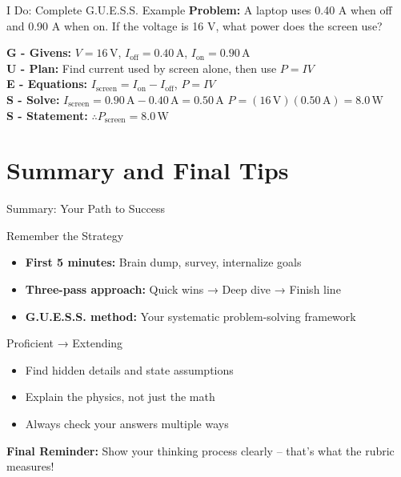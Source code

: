 \documentclass{beamer}
\begin{document}
\begin{frame}{I Do: Complete G.U.E.S.S. Example}
\textbf{Problem:} A laptop uses 0.40 A when off and 0.90 A when on. If the voltage is 16 V, what power does the screen use?
\pause
\vspace{0.5cm}

\textbf{G - Givens:} $V = 16\,\text{V}$, $I_{\text{off}} = 0.40\,\text{A}$, $I_{\text{on}} = 0.90\,\text{A}$ \\
\pause
\textbf{U - Plan:} Find current used by screen alone, then use $P = IV$ \\
\pause
\textbf{E - Equations:} $I_{\text{screen}} = I_{\text{on}} - I_{\text{off}}$, $P = IV$ \\
\pause
\textbf{S - Solve:} 
$I_{\text{screen}} = 0.90\,\text{A} - 0.40\,\text{A} = 0.50\,\text{A}$
$P = (16\,\text{V})(0.50\,\text{A}) = 8.0\,\text{W}$ \\
\pause
\textbf{S - Statement:} $\boxed{\therefore P_{\text{screen}} = 8.0\,\text{W}}$
\end{frame}


\section{Summary and Final Tips}

\begin{frame}{Summary: Your Path to Success}
\begin{block}{Remember the Strategy}
\begin{itemize}
\item \textbf{First 5 minutes:} Brain dump, survey, internalize goals
\item \textbf{Three-pass approach:} Quick wins → Deep dive → Finish line
\item \textbf{G.U.E.S.S. method:} Your systematic problem-solving framework
\end{itemize}
\end{block}

\begin{block}{Proficient → Extending}
\begin{itemize}
\item Find hidden details and state assumptions
\item Explain the physics, not just the math
\item Always check your answers multiple ways
\end{itemize}
\end{block}

\textbf{Final Reminder:} Show your thinking process clearly – that's what the rubric measures!
\end{frame}
\end{document}
